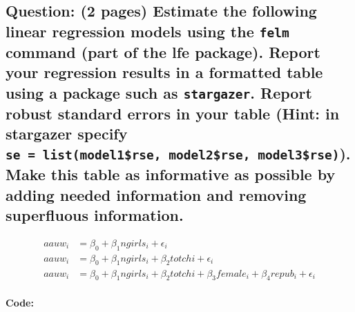 \documentclass[
]{article}
\begin{document}
\hypertarget{question-2-pages-estimate-the-following-linear-regression-models-using-the-felm-command-part-of-the-lfe-package.-report-your-regression-results-in-a-formatted-table-using-a-package-such-as-stargazer.-report-robust-standard-errors-in-your-table-hint-in-stargazer-specify-se-listmodel1rse-model2rse-model3rse.-make-this-table-as-informative-as-possible-by-adding-needed-information-and-removing-superfluous-information.}{%
\subsection{\texorpdfstring{Question: (2 pages) Estimate the following
linear regression models using the \texttt{felm} command (part of the
lfe package). Report your regression results in a formatted table using
a package such as \texttt{stargazer}. Report robust standard errors in
your table (Hint: in stargazer specify
\texttt{se\ =\ list(model1\$rse,\ model2\$rse,\ model3\$rse)}). Make
this table as informative as possible by adding needed information and
removing superfluous
information.}{Question: (2 pages) Estimate the following linear regression models using the felm command (part of the lfe package). Report your regression results in a formatted table using a package such as stargazer. Report robust standard errors in your table (Hint: in stargazer specify se = list(model1\$rse, model2\$rse, model3\$rse)). Make this table as informative as possible by adding needed information and removing superfluous information.}}\label{question-2-pages-estimate-the-following-linear-regression-models-using-the-felm-command-part-of-the-lfe-package.-report-your-regression-results-in-a-formatted-table-using-a-package-such-as-stargazer.-report-robust-standard-errors-in-your-table-hint-in-stargazer-specify-se-listmodel1rse-model2rse-model3rse.-make-this-table-as-informative-as-possible-by-adding-needed-information-and-removing-superfluous-information.}}

\[
\begin{aligned}
 aauw_i&=\beta_0+\beta_1ngirls_i+\epsilon_i\\
 aauw_i&=\beta_0+\beta_1ngirls_i+\beta_2totchi+\epsilon_i\\
  aauw_i&=\beta_0+\beta_1ngirls_i+\beta_2totchi+\beta_3female_i+\beta_4repub_i+\epsilon_i\\
\end{aligned}
\]

\textbf{Code:}
\end{document}
